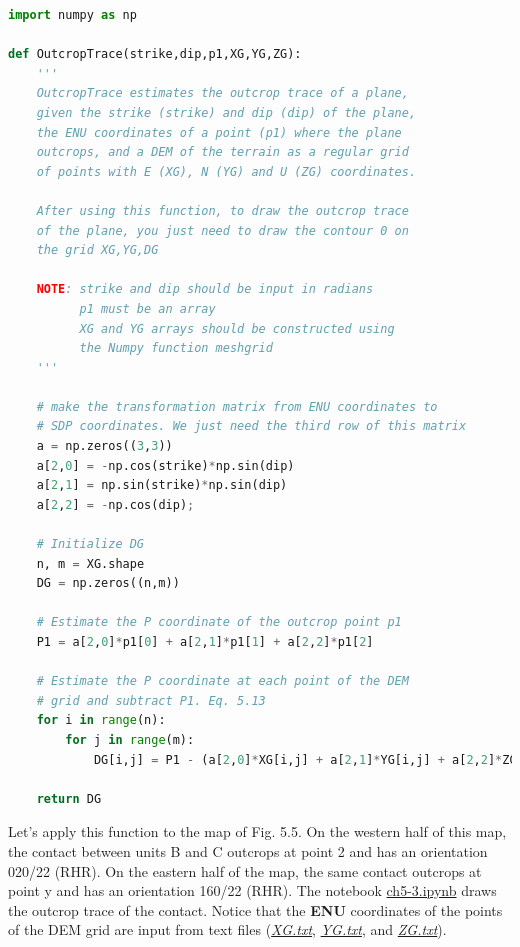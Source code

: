 \documentclass[a4paper , 12pt]{book}
\begin{document}
\begin{lstlisting}[language=Python, frame=single]
import numpy as np

def OutcropTrace(strike,dip,p1,XG,YG,ZG):
    '''
    OutcropTrace estimates the outcrop trace of a plane,
    given the strike (strike) and dip (dip) of the plane,
    the ENU coordinates of a point (p1) where the plane
    outcrops, and a DEM of the terrain as a regular grid
    of points with E (XG), N (YG) and U (ZG) coordinates.
    
    After using this function, to draw the outcrop trace 
    of the plane, you just need to draw the contour 0 on 
    the grid XG,YG,DG
    
    NOTE: strike and dip should be input in radians
          p1 must be an array
          XG and YG arrays should be constructed using 
          the Numpy function meshgrid
    '''
    
    # make the transformation matrix from ENU coordinates to 
    # SDP coordinates. We just need the third row of this matrix
    a = np.zeros((3,3))
    a[2,0] = -np.cos(strike)*np.sin(dip) 
    a[2,1] = np.sin(strike)*np.sin(dip) 
    a[2,2] = -np.cos(dip);
    
    # Initialize DG
    n, m = XG.shape
    DG = np.zeros((n,m))
    
    # Estimate the P coordinate of the outcrop point p1
    P1 = a[2,0]*p1[0] + a[2,1]*p1[1] + a[2,2]*p1[2]
    
    # Estimate the P coordinate at each point of the DEM
    # grid and subtract P1. Eq. 5.13
    for i in range(n):
        for j in range(m):
            DG[i,j] = P1 - (a[2,0]*XG[i,j] + a[2,1]*YG[i,j] + a[2,2]*ZG[i,j])
    
    return DG  
\end{lstlisting}

Let's apply this function to the map of Fig. 5.5. On the western half of this map, the contact between units B and C outcrops at point 2 and has an orientation 020/22 (RHR). On the eastern half of the map, the same contact outcrops at point y and has an orientation 160/22 (RHR). The notebook \href{http://github.com}{ch5-3.ipynb} draws the outcrop trace of the contact. Notice that the \textbf{ENU} coordinates of the points of the DEM grid are input from text files (\href{http://github.com}{\textit{XG.txt}}, \href{http://github.com}{\textit{YG.txt}}, and \href{http://github.com}{\textit{ZG.txt}}).
\end{document}
